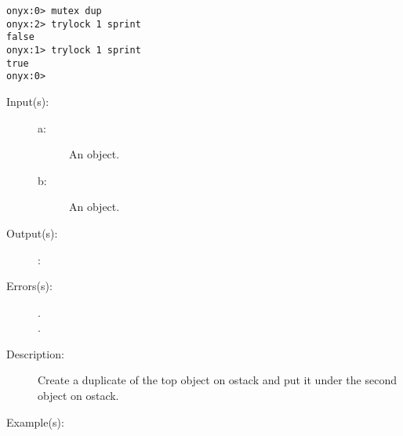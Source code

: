\begin{description}
\begin{description}
\begin{verbatim}
onyx:0> mutex dup 
onyx:2> trylock 1 sprint
false
onyx:1> trylock 1 sprint
true
onyx:0>
		\end{verbatim}
	\end{description}
\label{systemdict:tuck}
\item[{\onyxop{a b}{tuck}{b a b}}: ]
	\begin{description}\item[]
	\item[Input(s): ]
		\begin{description}\item[]
		\item[a: ]
			An object.
		\item[b: ]
			An object.
		\end{description}
	\item[Output(s): ]
		\begin{description}\item[]
		\item[: ]
		\end{description}
	\item[Errors(s): ]
		\begin{description}\item[]
		\item[.]
		\item[.]
		\end{description}
	\item[Description: ]
		Create a duplicate of the top object on ostack and put it under
		the second object on ostack.
	\item[Example(s): ]\begin{verbatim}


\end{verbatim}
\end{description}
\end{description}
